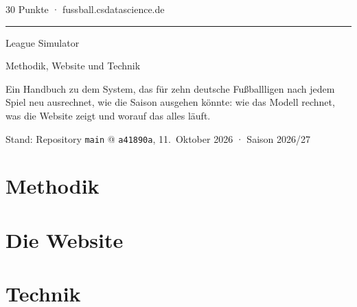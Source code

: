 \documentclass[11pt,a4paper,parskip=half,toc=bibliography,numbers=noenddot]{scrreprt}
\renewcommand{\_}{\BreakableUnderscore}
\begin{document}
\begin{titlepage}
  \raggedright
  \vspace*{3cm}
  {\sffamily\small\color{ink3} 30 Punkte · fussball.csdatascience.de\par}
  \vspace{6pt}
  {\color{akzent}\rule{40pt}{2pt}\par}
  \vspace{14pt}
  {\fontsize{38}{42}\selectfont League Simulator\par}
  \vspace{10pt}
  {\Large\color{ink2} Methodik, Website und Technik\par}
  \vspace{2cm}
  \begin{minipage}{0.8\textwidth}
    \color{ink2}
    Ein Handbuch zu dem System, das für zehn deutsche Fußballligen nach jedem
    Spiel neu ausrechnet, wie die Saison ausgehen könnte: wie das Modell
    rechnet, was die Website zeigt und worauf das alles läuft.
  \end{minipage}
  \vfill
  {\sffamily\small\color{ink3}
  Stand: Repository \texttt{main} @ \texttt{a41890a}, 11.~Oktober 2026 · Saison 2026/27\par}
\end{titlepage}

\tableofcontents



\part{Methodik}







\part{Die Website}





\part{Technik}





\appendix

\end{document}
